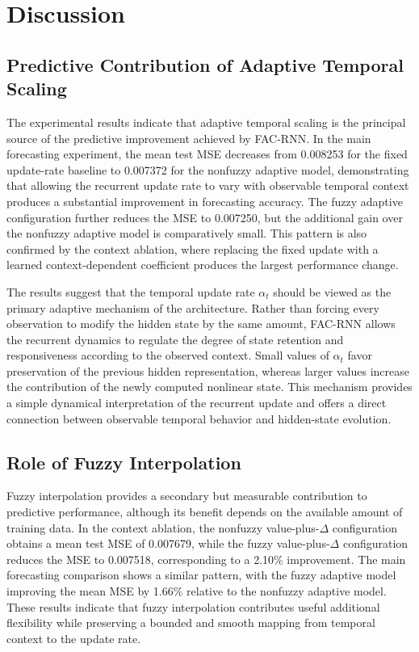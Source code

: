 \documentclass[journal]{IEEEtran}
\begin{document}
	
	\section{Discussion}
	\label{sec:discussion}
	
	\subsection{Predictive Contribution of Adaptive Temporal Scaling}
	\label{subsec:adaptive_contribution}
	
	The experimental results indicate that adaptive temporal scaling is the principal source of the predictive improvement achieved by FAC-RNN. In the main forecasting experiment, the mean test MSE decreases from 0.008253 for the fixed update-rate baseline to 0.007372 for the nonfuzzy adaptive model, demonstrating that allowing the recurrent update rate to vary with observable temporal context produces a substantial improvement in forecasting accuracy. The fuzzy adaptive configuration further reduces the MSE to 0.007250, but the additional gain over the nonfuzzy adaptive model is comparatively small. This pattern is also confirmed by the context ablation, where replacing the fixed update with a learned context-dependent coefficient produces the largest performance change.
	
	The results suggest that the temporal update rate $\alpha_t$ should be viewed as the primary adaptive mechanism of the architecture. Rather than forcing every observation to modify the hidden state by the same amount, FAC-RNN allows the recurrent dynamics to regulate the degree of state retention and responsiveness according to the observed context. Small values of $\alpha_t$ favor preservation of the previous hidden representation, whereas larger values increase the contribution of the newly computed nonlinear state. This mechanism provides a simple dynamical interpretation of the recurrent update and offers a direct connection between observable temporal behavior and hidden-state evolution.
	
	\subsection{Role of Fuzzy Interpolation}
	\label{subsec:fuzzy_role}
	
	Fuzzy interpolation provides a secondary but measurable contribution to predictive performance, although its benefit depends on the available amount of training data. In the context ablation, the nonfuzzy value-plus-$\Delta$ configuration obtains a mean test MSE of 0.007679, while the fuzzy value-plus-$\Delta$ configuration reduces the MSE to 0.007518, corresponding to a 2.10\% improvement. The main forecasting comparison shows a similar pattern, with the fuzzy adaptive model improving the mean MSE by 1.66\% relative to the nonfuzzy adaptive model. These results indicate that fuzzy interpolation contributes useful additional flexibility while preserving a bounded and smooth mapping from temporal context to the update rate.
	
\end{document}
